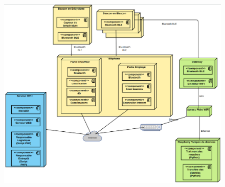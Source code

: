 \documentclass[10pt,a4paper]{article}
\begin{document}
\begin{figure}[h!]
    \centering
    \includegraphics[scale=0.2]{Images/diagramme_deploiement2.png}
    \caption{}
    \label{diagramme_deploiement2}
\end{figure}
\end{document}

